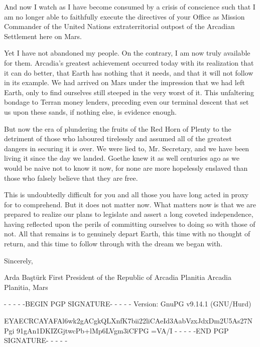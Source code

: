 And now I watch as I have become consumed by a crisis of conscience such that I am no longer able to faithfully execute the directives of your Office as Mission Commander of the United Nations extraterritorial outpost of the Arcadian Settlement here on Mars.

Yet I have not abandoned my people. On the contrary, I am now truly available for them. Arcadia's greatest achievement occurred today with its realization that it can do better, that Earth has nothing that it needs, and that it will not follow in its example. We had arrived on Mars under the impression that we had left Earth, only to find ourselves still steeped in the very worst of it. This unfaltering bondage to Terran money lenders, preceding even our terminal descent that set us upon these sands, if nothing else, is evidence enough.

But now the era of plundering the fruits of the Red Horn of Plenty to the detriment of those who laboured tirelessly and assumed all of the greatest dangers in securing it is over. We were lied to, Mr. Secretary, and we have been living it since the day we landed. Goethe knew it as well centuries ago as we would be naive not to know it now, for none are more hopelessly enslaved than those who falsely believe that they are free.

This is undoubtedly difficult for you and all those you have long acted in proxy for to comprehend. But it does not matter now. What matters now is that we are prepared to realize our plans to legislate and assert a long coveted independence, having reflected upon the perils of committing ourselves to doing so with those of not. All that remains is to genuinely depart Earth, this time with no thought of return, and this time to follow through with the dream we began with.

Sincerely, 

\hskip 1.5cm 
   
Arda Baştürk
First President of the Republic of Arcadia Planitia
Arcadia Planitia, Mars

- - - - -BEGIN PGP SIGNATURE- - - - -
Version: GnuPG v9.14.1 (GNU/Hurd)

EYAECRCAYAFAl6wk2gACgkQLXnfK7bii22liCAeId3AabVzxJdxDm2U5As27NPgi
91gAn1DKIZGjtwcPb+lMp6LVgm3iCFPG
=VA/I
- - - - -END PGP SIGNATURE- - - - -
\stoplines

